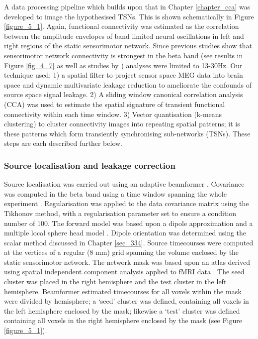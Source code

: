 A data processing pipeline which builds upon that in Chapter \ref{chapter_cca} was developed to image the hypothesised TSNs. This is shown schematically in Figure \ref{figure_5_1}. Again, functional connectivity was estimated as the correlation between the amplitude envelopes of band limited neural oscillations in left and right regions of the static sensorimotor network. Since previous studies show that sensorimotor network connectivity is strongest in the beta band (see results in Figure \ref{fig_4_7} as well as studies by  \citealp{Brookes2011a,Hipp2012,Brookes2014}) analyses were limited to 13-30Hz. Our technique used: 1) a spatial filter to project sensor space MEG data into brain space and dynamic multivariate leakage reduction to ameliorate the confounds of source space signal leakage. 2) A sliding window canonical correlation analysis (CCA) was used to estimate the spatial signature of transient functional connectivity within each time window. 3) Vector quantisation (k-means clustering) to cluster connectivity images into repeating spatial patterns; it is these patterns which form transiently synchronising sub-networks (TSNs). These steps are each described further below.

\subsubsection{Source localisation and leakage correction}
Source localisation was carried out using an adaptive beamformer \citep{VanVeen1997,Robinson1999}. Covariance was computed in the beta band using a time window spanning the whole experiment \citep{Brookes2008}. Regularisation was applied to the data covariance matrix using the Tikhonov method, with a regularisation parameter set to ensure a condition number of 100. The forward model was based upon a dipole approximation \citep{Sarvas1987} and a multiple local sphere head model \citep{Huang1999}. Dipole orientation was determined using the scalar method discussed in Chapter \ref{sec_334}. Source timecourses were computed at the vertices of a regular (8 mm) grid spanning the volume enclosed by the static sensorimotor network. The network mask was based upon an atlas derived using spatial independent component analysis applied to fMRI data \citep{Filippini2009}. The seed cluster was placed in the right hemisphere and the test cluster in the left hemisphere. Beamformer estimated timecourses for all voxels within the mask were divided by hemisphere; a ‘seed’ cluster was defined, containing all voxels in the left hemisphere enclosed by the mask; likewise a ‘test’ cluster was defined containing all voxels in the right hemisphere enclosed by the mask (see Figure \ref{figure_5_1}). 

